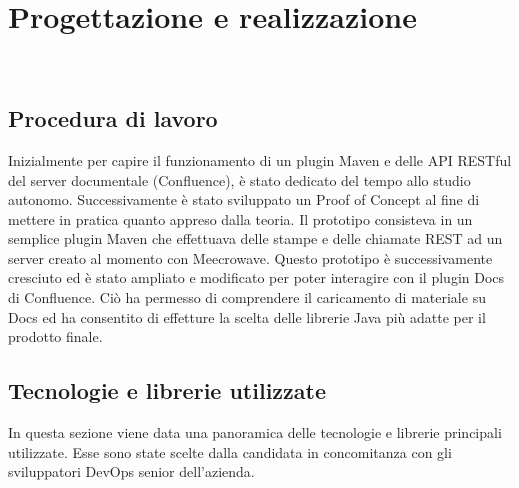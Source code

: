 
\chapter{Progettazione e realizzazione}
\label{cap:progettazione}

\\

\section{Procedura di lavoro}
Inizialmente per capire il funzionamento di un plugin Maven e delle API RESTful del server documentale (Confluence), è stato dedicato del tempo allo studio autonomo.
Successivamente è stato sviluppato un Proof of Concept al fine di mettere in pratica quanto appreso dalla teoria.
Il prototipo consisteva in un semplice plugin Maven che effettuava delle stampe e delle chiamate REST ad un server creato al momento con Meecrowave.
Questo prototipo è successivamente cresciuto ed è stato ampliato e modificato per poter interagire con il plugin Docs di Confluence.
Ciò ha permesso di comprendere il caricamento di materiale su Docs ed ha consentito di effetture la scelta delle librerie Java più adatte per il prodotto finale.


\section{Tecnologie e librerie utilizzate}
\label{sec:tecnologie-strumenti}

In questa sezione viene data una panoramica delle tecnologie e librerie principali utilizzate.
Esse sono state scelte dalla candidata in concomitanza con gli sviluppatori DevOps senior dell'azienda.


